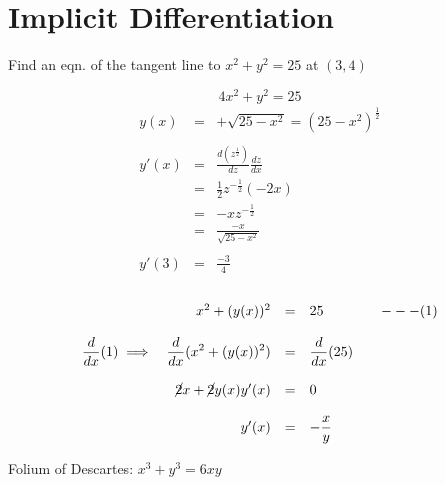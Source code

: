 \section{Implicit Differentiation}
\begin{eg}
Find an eqn. of the tangent line to $x^2 + y^2 = 25$ at $(3, 4)$

$$4x^2+y^2 =25$$
$$\begin{array}{rcl}
y(x) & = & + \sqrt{25 - x^2} = (25-x^2)^{\frac{1}{2}}\\\\
y'(x) & = & \displaystyle \frac{d(z^{\frac{1}{2}})}{dz} \frac{dz}{dx}\\
& = & \displaystyle \frac{1}{2} z^{-\frac{1}{2}} (-2 x)\\
& = & \displaystyle -x z^{-\frac{1}{2}}\\
& = & \displaystyle \frac{-x}{\sqrt{25-x^2}}\\\\
y'(3) & = & \displaystyle \frac{-3}{4}
\end{array}$$\\
$$\begin{array}{rrclll}
& x^2 + (y(x))^2 & = & 25 && ---(1)\\\\
\displaystyle \frac{d}{dx}(1) \implies & \displaystyle \frac{d}{dx} (x^2 + (y(x))^2) & = & \displaystyle \frac{d}{dx} (25)\\\\
& \cancel{2}x + \cancel{2}y(x)y'(x) & = & 0\\\\
& y'(x) & = & \displaystyle -\frac{x}{y}
\end{array}$$
\end{eg}

\begin{notn}
Folium of Descartes: $x^3 + y^3 = 6xy$
\end{notn}


